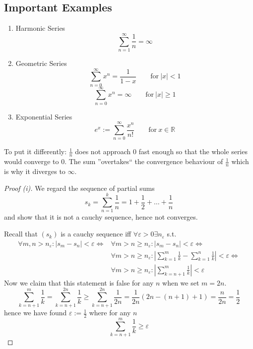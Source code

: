 \subsection{Important Examples}
\begin{proposition}
   \begin{enumerate}[label=\roman*, align=Center]
      \item Harmonic Series
         \[\sum_{n = 1}^\infty \frac{1}{n} = \infty\]
      \item Geometric Series
         \[\sum_{n = 0}^\infty x^n = \frac{1}{1 - x} \qquad\text{for}~|x| < 1\]
         \[\sum_{n = 0}^\infty x^n = \infty \qquad\text{for}~|x| \geq 1\]
      \item Exponential Series
         \[e^x := \sum_{n=0}^\infty \frac{x^n}{n!} \qquad\text{for}~x \in \mathbb{R}\]
   \end{enumerate}
\end{proposition}
\begin{remark}
   To put it differently: \(\frac{1}{n}\) does not approach 0 fast enough so that the whole series would converge to 0.
   The sum ''overtakes`` the convergence behaviour of \(\frac{1}{n}\) which is why it diverges to \(\infty\).
\end{remark}
\begin{proof}[Proof (i)]
   We regard the sequence of partial sums
   \[s_k = \sum_{n = 1}^k \frac{1}{n} = 1 + \frac{1}{2} + \ldots + \frac{1}{n}\]
   and show that it is not a cauchy sequence, hence not converges.

   Recall that \((s_k)\) is a cauchy sequence iff \(\forall \varepsilon > 0 \exists n_\varepsilon\) s.t.
   \begin{equation*}
      \begin{split}
         \forall m, n > n_\varepsilon: |s_m - s_n| < \varepsilon \iff & \forall m > n \geq n_\varepsilon: |s_m - s_n| < \varepsilon \iff \\
                                                                      & \forall m > n \geq n_\varepsilon: \left|\sum_{k=1}^m \frac{1}{k} - \sum_{k = 1}^n \frac{1}{k}\right| < \varepsilon \iff \\
                                                                      & \forall m > n \geq n_\varepsilon: \left|\sum_{k=n+1}^m \frac{1}{k}\right| < \varepsilon
      \end{split}
   \end{equation*}
   Now we claim that this statement is false for any \(n\) when we set \(m = 2n\).
   \[\sum_{k=n+1}^{m} \frac{1}{k} = \sum_{k=n+1}^{2n} \frac{1}{k} \geq \sum_{k=n+1}^{2n} \frac{1}{2n} = \frac{1}{2n} (2n - (n+1) + 1) = \frac{n}{2n} = \frac{1}{2}\]
   hence we have found \(\varepsilon := \frac{1}{2}\) where for any \(n\)
   \[\sum_{k=n+1}^{m} \frac{1}{k} \geq \varepsilon\]
\end{proof}
